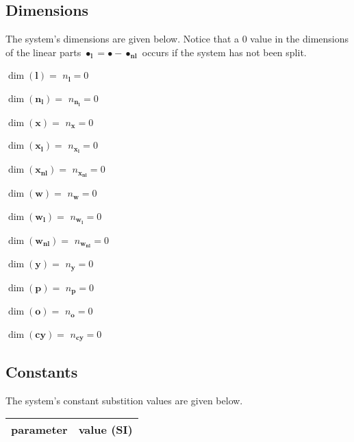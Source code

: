 \documentclass[11pt, oneside]{article}      %
\begin{document}
\subsection{Dimensions}
%
The system's dimensions are given below.
%
Notice that a 0 value in the dimensions of the linear parts
$\bullet_{\mathbf{l}} = \bullet-\bullet_{\mathbf{nl}}$ occurs if the system has
not been split.
%
\par  $\dim(\mathbf{l})=$ $ n_\mathbf{l} = 0$\par  $\dim(\mathbf{n_{l}})=$ $ n_\mathbf{n_{l}} = 0$\par  $\dim(\mathbf{x})=$ $ n_\mathbf{x} = 0$\par  $\dim(\mathbf{x_{l}})=$ $ n_\mathbf{x_{l}} = 0$\par  $\dim(\mathbf{x_{nl}})=$ $ n_\mathbf{x_{nl}} = 0$\par  $\dim(\mathbf{w})=$ $ n_\mathbf{w} = 0$\par  $\dim(\mathbf{w_{l}})=$ $ n_\mathbf{w_{l}} = 0$\par  $\dim(\mathbf{w_{nl}})=$ $ n_\mathbf{w_{nl}} = 0$\par  $\dim(\mathbf{y})=$ $ n_\mathbf{y} = 0$\par  $\dim(\mathbf{p})=$ $ n_\mathbf{p} = 0$\par  $\dim(\mathbf{o})=$ $ n_\mathbf{o} = 0$\par  $\dim(\mathbf{cy})=$ $ n_\mathbf{cy} = 0$
%
%
%
\subsection{Constants}
%
The system's constant substition values are given below.
%
\begin{center}
%
\begin{tabular}{ll}
%
\hline
parameter & value (SI)
\\ \hline
\hline
\end{tabular}
%
\end{center}
%
%
%
\end{document}
